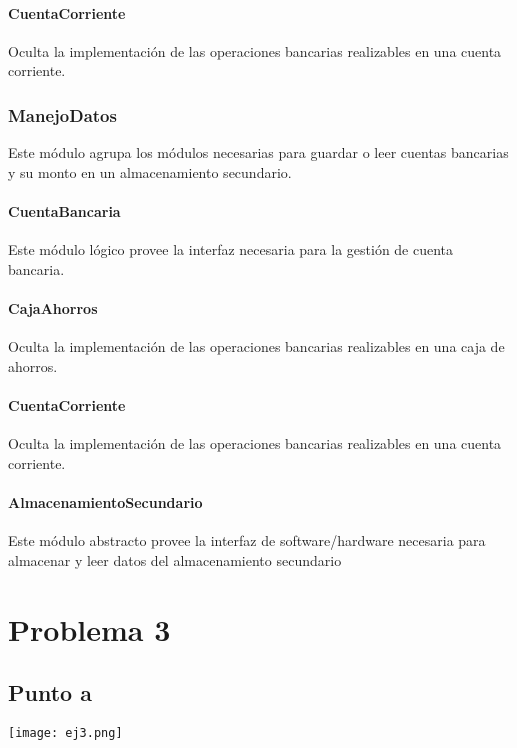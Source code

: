 \documentclass[12pt,a4paper,fleqn]{article}
\begin{document}
\paragraph{CuentaCorriente}
Oculta la implementación de las operaciones bancarias realizables en una cuenta corriente.

\subsubsection{ManejoDatos}
Este módulo agrupa los módulos necesarias para guardar o leer cuentas bancarias
y su monto en un almacenamiento secundario.
\paragraph{CuentaBancaria}
Este módulo lógico provee la interfaz necesaria para la gestión de cuenta bancaria.
\paragraph{CajaAhorros}
Oculta la implementación de las operaciones bancarias realizables en una caja de ahorros.
\paragraph{CuentaCorriente}
Oculta la implementación de las operaciones bancarias realizables en una cuenta corriente.
\paragraph{AlmacenamientoSecundario}
Este módulo abstracto provee la interfaz de software/hardware necesaria para almacenar y leer datos
del almacenamiento secundario
\newpage

\section{Problema 3}

\subsection{Punto a}
\texttt{[image: ej3.png]}
\end{document}
